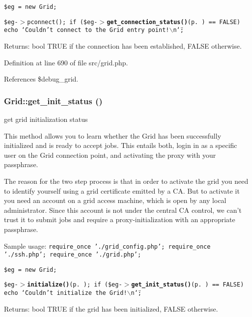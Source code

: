 {\tt  \$eg = new Grid;}

{\tt  \$eg-$>$pconnect(); if (\$eg-$>${\bf get\_\-connection\_\-status()}{\rm (p.\,\pageref{classGrid_a8})} == FALSE) echo \char`\"{}Couldn't connect to the Grid entry point!$\backslash$n\char`\"{}; }

\begin{Desc}
\item[Returns:]bool TRUE if the connection has been established, FALSE otherwise. \end{Desc}


Definition at line 690 of file src/grid.php.

References \$debug\_\-grid.
\subsubsection{\setlength{\rightskip}{0pt plus 5cm}Grid::get\_\-init\_\-status ()}\label{classGrid_a35}


get grid initialization status 

This method allows you to learn whether the Grid has been successfully initialized and is ready to accept jobs. This entails both, login in as a specific user on the Grid connection point, and activating the proxy with your passphrase.

The reason for the two step process is that in order to activate the grid you need to identify yourself using a grid certificate emitted by a CA. But to activate it you need an account on a grid access machine, which is open by any local administrator. Since this account is not under the central CA control, we can't trust it to submit jobs and require a proxy-initialization with an appropriate passphrase.

Sample usage: {\tt  require\_\-once './grid\_\-config.php'; require\_\-once './ssh.php'; require\_\-once './grid.php';}

{\tt  \$eg = new Grid;}

{\tt  \$eg-$>${\bf initialize()}{\rm (p.\,\pageref{classGrid_a11})}; if (\$eg-$>${\bf get\_\-init\_\-status()}{\rm (p.\,\pageref{classGrid_a9})} == FALSE) echo \char`\"{}Couldn't initialize the Grid!$\backslash$n\char`\"{}; }

\begin{Desc}
\item[Returns:]bool TRUE if the grid has been initialized, FALSE otherwise. \end{Desc}


